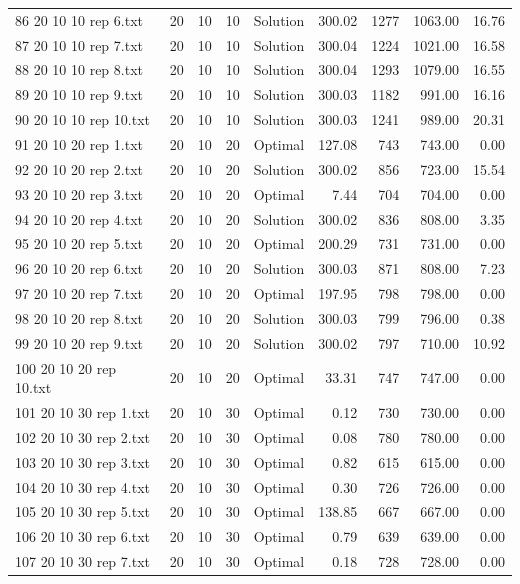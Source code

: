 \begin{longtable}{lrrllrrrr}
86 20 10 10 rep 6.txt & 20 & 10 & 10 & Solution & 300.02 & 1277 & 1063.00 & 16.76\\
87 20 10 10 rep 7.txt & 20 & 10 & 10 & Solution & 300.04 & 1224 & 1021.00 & 16.58\\
88 20 10 10 rep 8.txt & 20 & 10 & 10 & Solution & 300.04 & 1293 & 1079.00 & 16.55\\
89 20 10 10 rep 9.txt & 20 & 10 & 10 & Solution & 300.03 & 1182 & 991.00 & 16.16\\
90 20 10 10 rep 10.txt & 20 & 10 & 10 & Solution & 300.03 & 1241 & 989.00 & 20.31\\
91 20 10 20 rep 1.txt & 20 & 10 & 20 & Optimal & 127.08 & 743 & 743.00 &  0.00\\
92 20 10 20 rep 2.txt & 20 & 10 & 20 & Solution & 300.02 & 856 & 723.00 & 15.54\\
93 20 10 20 rep 3.txt & 20 & 10 & 20 & Optimal &  7.44 & 704 & 704.00 &  0.00\\
94 20 10 20 rep 4.txt & 20 & 10 & 20 & Solution & 300.02 & 836 & 808.00 &  3.35\\
95 20 10 20 rep 5.txt & 20 & 10 & 20 & Optimal & 200.29 & 731 & 731.00 &  0.00\\
96 20 10 20 rep 6.txt & 20 & 10 & 20 & Solution & 300.03 & 871 & 808.00 &  7.23\\
97 20 10 20 rep 7.txt & 20 & 10 & 20 & Optimal & 197.95 & 798 & 798.00 &  0.00\\
98 20 10 20 rep 8.txt & 20 & 10 & 20 & Solution & 300.03 & 799 & 796.00 &  0.38\\
99 20 10 20 rep 9.txt & 20 & 10 & 20 & Solution & 300.02 & 797 & 710.00 & 10.92\\
100 20 10 20 rep 10.txt & 20 & 10 & 20 & Optimal & 33.31 & 747 & 747.00 &  0.00\\
101 20 10 30 rep 1.txt & 20 & 10 & 30 & Optimal &  0.12 & 730 & 730.00 &  0.00\\
102 20 10 30 rep 2.txt & 20 & 10 & 30 & Optimal &  0.08 & 780 & 780.00 &  0.00\\
103 20 10 30 rep 3.txt & 20 & 10 & 30 & Optimal &  0.82 & 615 & 615.00 &  0.00\\
104 20 10 30 rep 4.txt & 20 & 10 & 30 & Optimal &  0.30 & 726 & 726.00 &  0.00\\
105 20 10 30 rep 5.txt & 20 & 10 & 30 & Optimal & 138.85 & 667 & 667.00 &  0.00\\
106 20 10 30 rep 6.txt & 20 & 10 & 30 & Optimal &  0.79 & 639 & 639.00 &  0.00\\
107 20 10 30 rep 7.txt & 20 & 10 & 30 & Optimal &  0.18 & 728 & 728.00 &  0.00\\

\end{longtable}
